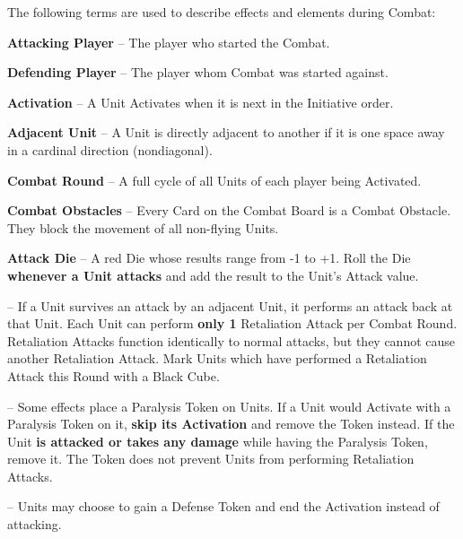 \begin{multicols*}{2}
The following terms are used to describe effects and elements during Combat:\par
\textbf{Attacking Player} – The player who started the Combat.\par
\textbf{Defending Player} – The player whom Combat was started against.\par
\textbf{Activation} – A Unit Activates when it is next in the Initiative order.\par
\textbf{Adjacent Unit} – A Unit is directly adjacent to another if it is one space away in a cardinal direction (nondiagonal).\par
\textbf{Combat Round} – A full cycle of all Units of each player being Activated.\par
\textbf{Combat Obstacles} – Every Card on the Combat Board is a Combat Obstacle.
They block the movement of all non-flying Units.\smallskip\par
{}\parbox{0.7\hsize}{\textbf{Attack Die} – A red Die whose results range from -1 to +1.
Roll the Die \textbf{whenever a Unit attacks} and
add the result to the Unit's Attack value.}\par\smallskip
\textbf{} – If a Unit survives an attack by an adjacent Unit, it performs an attack back at that Unit.
Each Unit can perform \textbf{only 1} Retaliation Attack per Combat Round.
Retaliation Attacks function identically to normal attacks, but they cannot cause another Retaliation Attack.
Mark Units which have performed a Retaliation Attack this Round with a Black Cube.\par
\textbf{}  – Some effects place a Paralysis Token on Units.
If a Unit would Activate with a Paralysis Token on it, \textbf{skip its Activation} and remove the Token instead.
If the Unit \textbf{is attacked or takes any damage} while having the Paralysis Token, remove it.
The Token does not prevent Units from performing Retaliation Attacks.\par
\textbf{}  – Units may choose to gain a Defense Token and end the Activation instead of attacking.

\end{multicols*}
